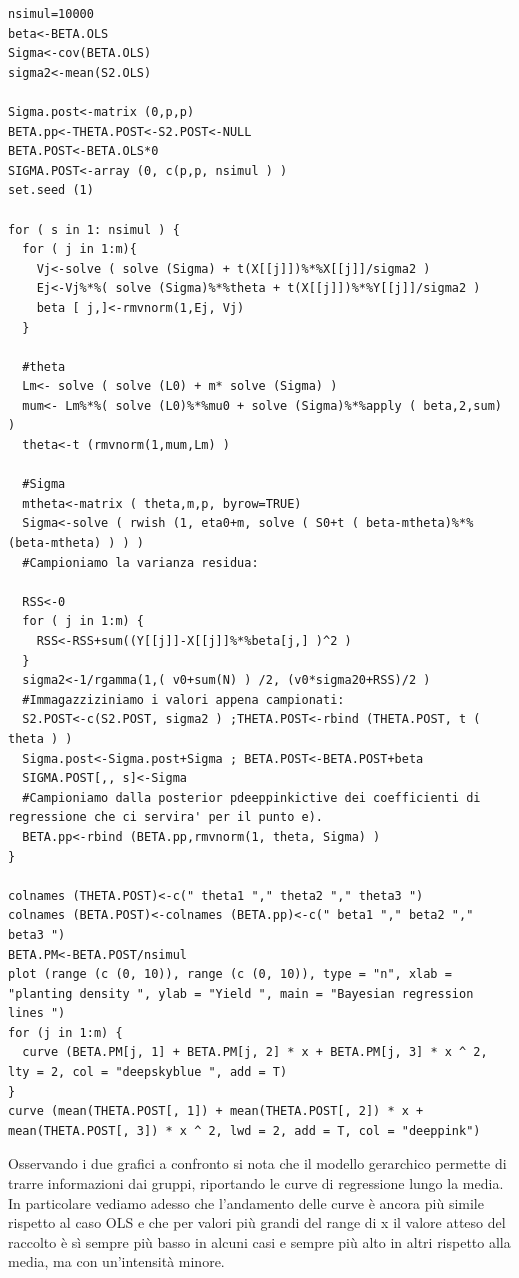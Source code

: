 \begin{lstlisting}[style=R]
nsimul=10000
beta<-BETA.OLS
Sigma<-cov(BETA.OLS)
sigma2<-mean(S2.OLS)

Sigma.post<-matrix (0,p,p)
BETA.pp<-THETA.POST<-S2.POST<-NULL
BETA.POST<-BETA.OLS*0
SIGMA.POST<-array (0, c(p,p, nsimul ) )
set.seed (1)

for ( s in 1: nsimul ) {
  for ( j in 1:m){
    Vj<-solve ( solve (Sigma) + t(X[[j]])%*%X[[j]]/sigma2 )
    Ej<-Vj%*%( solve (Sigma)%*%theta + t(X[[j]])%*%Y[[j]]/sigma2 )
    beta [ j,]<-rmvnorm(1,Ej, Vj)
  }
  
  #theta 
  Lm<- solve ( solve (L0) + m* solve (Sigma) )
  mum<- Lm%*%( solve (L0)%*%mu0 + solve (Sigma)%*%apply ( beta,2,sum) )
  theta<-t (rmvnorm(1,mum,Lm) )
  
  #Sigma
  mtheta<-matrix ( theta,m,p, byrow=TRUE)
  Sigma<-solve ( rwish (1, eta0+m, solve ( S0+t ( beta-mtheta)%*%(beta-mtheta) ) ) )
  #Campioniamo la varianza residua:
  
  RSS<-0
  for ( j in 1:m) {
    RSS<-RSS+sum((Y[[j]]-X[[j]]%*%beta[j,] )^2 )
  }
  sigma2<-1/rgamma(1,( v0+sum(N) ) /2, (v0*sigma20+RSS)/2 )
  #Immagazziziniamo i valori appena campionati:
  S2.POST<-c(S2.POST, sigma2 ) ;THETA.POST<-rbind (THETA.POST, t ( theta ) )
  Sigma.post<-Sigma.post+Sigma ; BETA.POST<-BETA.POST+beta
  SIGMA.POST[,, s]<-Sigma
  #Campioniamo dalla posterior pdeeppinkictive dei coefficienti di regressione che ci servira' per il punto e).
  BETA.pp<-rbind (BETA.pp,rmvnorm(1, theta, Sigma) )
}

colnames (THETA.POST)<-c(" theta1 "," theta2 "," theta3 ")
colnames (BETA.POST)<-colnames (BETA.pp)<-c(" beta1 "," beta2 "," beta3 ")
BETA.PM<-BETA.POST/nsimul
plot (range (c (0, 10)), range (c (0, 10)), type = "n", xlab = "planting density ", ylab = "Yield ", main = "Bayesian regression lines ")
for (j in 1:m) {
  curve (BETA.PM[j, 1] + BETA.PM[j, 2] * x + BETA.PM[j, 3] * x ^ 2, lty = 2, col = "deepskyblue ", add = T)
}
curve (mean(THETA.POST[, 1]) + mean(THETA.POST[, 2]) * x + mean(THETA.POST[, 3]) * x ^ 2, lwd = 2, add = T, col = "deeppink")
\end{lstlisting}
Osservando i due grafici a confronto si nota che il modello gerarchico permette 
di trarre informazioni dai gruppi, 
riportando le curve di regressione lungo la media. 
In particolare vediamo adesso che l'andamento delle curve è ancora più simile 
rispetto al caso OLS e che per valori più grandi del range di x il valore 
atteso del raccolto è sì sempre più basso in alcuni casi e sempre più alto in 
altri rispetto alla media, ma con un'intensità minore. 
